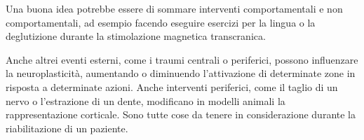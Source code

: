 Una buona idea potrebbe essere di sommare interventi comportamentali e non 
comportamentali, ad esempio facendo eseguire esercizi per la lingua o la 
deglutizione durante la stimolazione magnetica transcranica.

Anche altrei eventi esterni, come i traumi centrali o periferici, possono 
influenzare la neuroplasticità, aumentando o diminuendo l'attivazione di 
determinate zone in risposta a determinate azioni.
Anche interventi periferici, come il taglio di un nervo o l'estrazione di un 
dente, modificano in modelli animali la rappresentazione corticale.
Sono tutte cose da tenere in considerazione durante la riabilitazione di un 
paziente.

